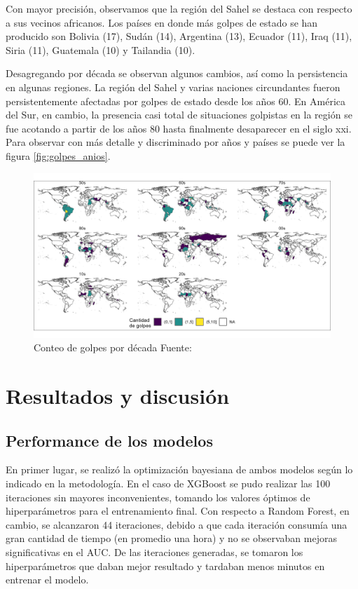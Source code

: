 \documentclass{article}
\begin{document}
Con mayor precisión, observamos que la región del Sahel se destaca con respecto a sus
vecinos africanos. Los países en donde más golpes de estado se han producido son
Bolivia (17), Sudán (14), Argentina (13), Ecuador (11), Iraq (11), Siria (11), 
Guatemala (10) y Tailandia (10).

Desagregando por década se observan algunos cambios, así como la persistencia en 
algunas regiones. La región del Sahel y varias naciones circundantes fueron 
persistentemente afectadas por golpes de estado desde los años 60. En América del 
Sur, en cambio, la presencia casi total de situaciones golpistas en la región se 
fue acotando a partir de los años 80 hasta finalmente desaparecer en el siglo 
xxi. Para observar con más detalle y discriminado por años y países se puede ver 
la figura \ref{fig:golpes_anios}.

\begin{figure}[H]
 \centering 
 \includegraphics[width=1\textwidth]{3_golpes_decadas.png}
 \caption{Conteo de golpes por década Fuente:\cite{Pow11} \label{fig:golpes_decadas}}
\end{figure}

\section{Resultados y discusión}

\subsection{Performance de los modelos}
En primer lugar, se realizó la optimización bayesiana de ambos modelos según lo indicado
en la metodología. En el caso de XGBoost se pudo realizar las 100 iteraciones sin mayores
inconvenientes, tomando los valores óptimos de hiperparámetros para el entrenamiento 
final. Con respecto a Random Forest, en cambio, se alcanzaron 44 iteraciones, debido a que cada
iteración consumía una gran cantidad de tiempo (en promedio una hora) y no se observaban
mejoras significativas en el AUC. De las iteraciones generadas, se tomaron los hiperparámetros
que daban mejor resultado y tardaban menos minutos en entrenar el modelo.
\end{document}
